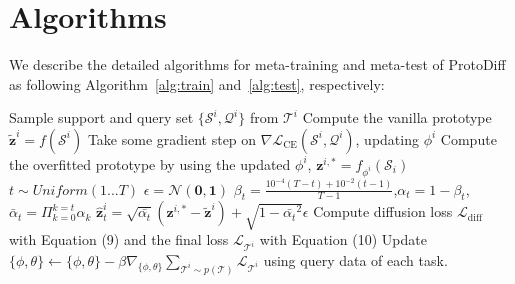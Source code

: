 

\section{Algorithms}
We describe the detailed algorithms for meta-training and meta-test of ProtoDiff as following Algorithm~\ref{alg:train} and~\ref{alg:test}, respectively:

\begin{algorithm}[h]
\caption{Meta-training phase of ProtoDiff. \\ \textbf{Input:} $p(\mathcal{T})$: distribution over tasks; $\theta$: diffusion parameters; $\phi$: feature extractor parameters; $T$:  diffusion steps.\\
\textbf{Output:} $\mathbf{z}_{\theta}$: diffusion network, $f_{\phi}$: feature extractor.}
\label{alg:train}
\begin{algorithmic}[1]
\REPEAT
\STATE {}
\STATE Sample support and query set $\{\mathcal{S}^i, \mathcal{Q}^i\}$ from $\mathcal{T}^i$
\STATE Compute the vanilla prototype $\tilde{\mathbf{z}}^i = f(\mathcal{S}^i)$
\REPEAT
    \STATE Take some gradient step on $\nabla \mathcal{L}_{\mathrm{CE}}(\mathcal{S}^i, \mathcal{Q}^i)$, updating $\phi^i$ 
\STATE Compute the overfitted prototype by using the updated $\phi^i$, $\mathbf{z}^{i, *} = f_{\phi^i}(\mathcal{S}_i)$
    \STATE $t \sim Uniform({1...T})$
\STATE $\epsilon = \mathcal{N}(\mathbf{0},\mathbf{1})$
\STATE $\beta_t = \frac{10^{-4}(T-t) + 10^{-2}(t-1)}{T-1}$,$\alpha_t = 1-\beta_t$,
$\bar{\alpha}_t = \Pi_{k=0}^{k=t} \alpha_k $
\STATE $\hat{\mathbf{z}}_t^i = \sqrt{\bar{\alpha_t}}(\mathbf{z}^{i, *} - \tilde{\mathbf{z}}^i) + \sqrt{1-\bar{\alpha_t}^2}\epsilon$  
\STATE Compute diffusion loss $\mathcal{L}_{\mathrm{diff}}$ with Equation (9) and the final loss $\mathcal{L}_{\mathcal{T}^i}$ with Equation (10)
\STATE Update $\{\phi, \theta\} \leftarrow \{\phi, \theta\} - \beta \nabla_{\{\phi, \theta\}} \sum_{\mathcal{T}^i \sim p(\mathcal{T})} \mathcal{L}_{\mathcal{T}^i}$ using query data of each task.
\ENDFOR
{}
\end{algorithmic}
\end{algorithm}


